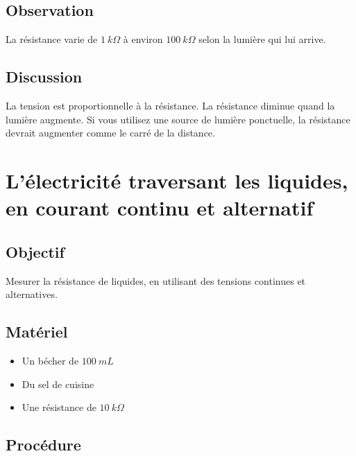 \documentclass{book}
\begin{document}
\subsection{Observation}


La résistance varie de $1\ k\Omega$  à environ $100\ k\Omega$  selon la lumière qui lui arrive.

\subsection{Discussion}


La tension est proportionnelle à la résistance. La résistance diminue quand la lumière augmente. Si vous utilisez une source de lumière ponctuelle, la résistance devrait augmenter comme le carré de la distance.










\section{L'électricité traversant les liquides, en courant continu et alternatif}



\subsection{Objectif}


Mesurer la résistance de liquides, en utilisant des tensions continues et alternatives.




\subsection{Matériel}


\begin{itemize}
  \item Un bécher de $100\ mL$
  \item Du sel de cuisine
  \item Une résistance de $10\ k\Omega$
\end{itemize}

\subsection{Procédure}
\end{document}
